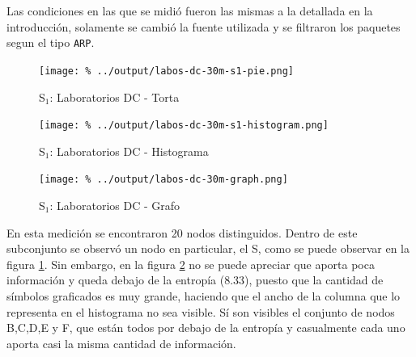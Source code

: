 \documentclass[final,inline,a4paper,narroweqnarray]{ieee}
\begin{document}
  Las condiciones en las que se midió fueron las mismas a la detallada
  en la introducción, solamente se cambió la fuente utilizada y se
  filtraron los paquetes segun el tipo \texttt{ARP}.

    \begin{figure}[ht]\begin{center}
      \texttt{[image: \%
      ../output/labos-dc-30m-s1-pie.png]}
      \vspace{-2em}
      \caption{S$_1$: Laboratorios DC - Torta}
      \label{labos-dc-30m-s1-pie}
    \end{center}\end{figure}

    \begin{figure}[ht]\begin{center}
      \texttt{[image: \%
      ../output/labos-dc-30m-s1-histogram.png]}
      \caption{S$_1$: Laboratorios DC - Histograma}
      \label{labos-dc-30m-s1-histogram}
    \end{center}\end{figure}

    \begin{figure}[ht]\begin{center}
      \texttt{[image: \%
      ../output/labos-dc-30m-graph.png]}
      \caption{S$_1$: Laboratorios DC - Grafo}
      \label{labos-dc-30m-graph}
    \end{center}\end{figure}

  En esta medición se encontraron 20 nodos distinguidos. Dentro de
  este subconjunto se observó un nodo en particular, el S, como se
  puede observar en la figura \ref{labos-dc-30m-s1-pie}. Sin embargo,
  en la figura \ref{labos-dc-30m-s1-histogram} no se puede apreciar
  que aporta poca información y queda debajo de la entropía (8.33),
  puesto que la cantidad de símbolos graficados es muy grande,
  haciendo que el ancho de la columna que lo representa en el
  histograma no sea visible. Sí son visibles el conjunto de nodos
  B,C,D,E y F, que están todos por debajo de la entropía y casualmente
  cada uno aporta casi la misma cantidad de información.
\end{document}
